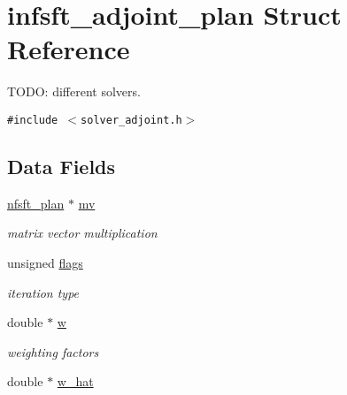 \hypertarget{structinfsft__adjoint__plan}{
\section{infsft\_\-adjoint\_\-plan Struct Reference}
\label{structinfsft__adjoint__plan}
}
TODO: different solvers.  


{\tt \#include $<$solver\_\-adjoint.h$>$}

\subsection*{Data Fields}
\begin{CompactItemize}
\item 
\hypertarget{structinfsft__adjoint__plan_791fe047a3b45cce8049e83d422b8414}{
\hyperlink{structnfsft__plan}{nfsft\_\-plan} $\ast$ \hyperlink{structinfsft__adjoint__plan_791fe047a3b45cce8049e83d422b8414}{mv}}
\label{structinfsft__adjoint__plan_791fe047a3b45cce8049e83d422b8414}

\begin{CompactList}\small\item\em matrix vector multiplication \item\end{CompactList}\item 
\hypertarget{structinfsft__adjoint__plan_6795cda9e0d83c5b5c7935b75d10dc1a}{
unsigned \hyperlink{structinfsft__adjoint__plan_6795cda9e0d83c5b5c7935b75d10dc1a}{flags}}
\label{structinfsft__adjoint__plan_6795cda9e0d83c5b5c7935b75d10dc1a}

\begin{CompactList}\small\item\em iteration type \item\end{CompactList}\item 
\hypertarget{structinfsft__adjoint__plan_9738a7ae6eb6e9ac59018d7fe0b67b32}{
double $\ast$ \hyperlink{structinfsft__adjoint__plan_9738a7ae6eb6e9ac59018d7fe0b67b32}{w}}
\label{structinfsft__adjoint__plan_9738a7ae6eb6e9ac59018d7fe0b67b32}

\begin{CompactList}\small\item\em weighting factors \item\end{CompactList}\item 
\hypertarget{structinfsft__adjoint__plan_5830886454142e4825347a703f286c0a}{
double $\ast$ \hyperlink{structinfsft__adjoint__plan_5830886454142e4825347a703f286c0a}{w\_\-hat}}
\label{structinfsft__adjoint__plan_5830886454142e4825347a703f286c0a}


\end{CompactItemize}

